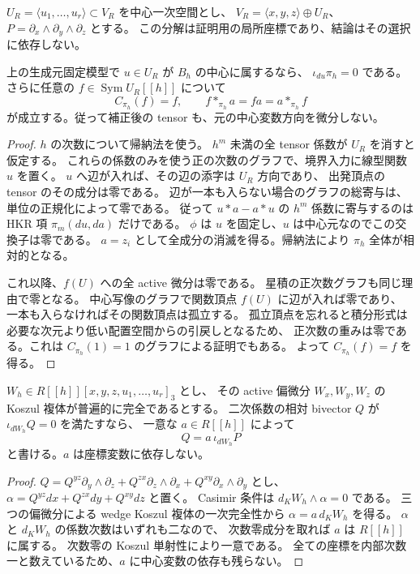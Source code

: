 $U_R=\langle u_1,\ldots,u_r\rangle\subset V_R$ を中心一次空間とし、
$V_R=\langle x,y,z\rangle\oplus U_R$、$P=\partial_x\wedge\partial_y\wedge\partial_z$ とする。
この分解は証明用の局所座標であり、結論はその選択に依存しない。

\begin{lemma}[線型中心の厳密な保存]
\label{lem:nfm-formal-linear-center}
上の生成元固定模型で $u\in U_R$ が $B_h$ の中心に属するなら、
$\iota_{du}\pi_h=0$ である。
さらに任意の $f\in\operatorname{Sym}U_R[[h]]$ について
\[
 C_{\pi_h}(f)=f,
 \qquad f*_{\pi_h}a=fa=a*_{\pi_h}f
\]
が成立する。従って補正後の tensor も、元の中心変数方向を微分しない。
\end{lemma}

\begin{proof}
$h$ の次数について帰納法を使う。
$h^m$ 未満の全 tensor 係数が $U_R$ を消すと仮定する。
これらの係数のみを使う正の次数のグラフで、境界入力に線型関数 $u$ を置く。
$u$ へ辺が入れば、その辺の添字は $U_R$ 方向であり、
出発頂点の tensor のその成分は零である。
辺が一本も入らない場合のグラフの総寄与は、単位の正規化によって零である。
従って $u* a-a*u$ の $h^m$ 係数に寄与するのは
HKR 項 $\pi_m(du,da)$ だけである。
$\phi$ は $u$ を固定し、$u$ は中心元なのでこの交換子は零である。
$a=z_i$ として全成分の消滅を得る。帰納法により $\pi_h$ 全体が相対的となる。

これ以降、$f(U)$ への全 active 微分は零である。
星積の正次数グラフも同じ理由で零となる。
中心写像のグラフで関数頂点 $f(U)$ に辺が入れば零であり、
一本も入らなければその関数頂点は孤立する。
孤立頂点を忘れると積分形式は必要な次元より低い配置空間からの引戻しとなるため、
正次数の重みは零である。これは $C_{\pi_h}(1)=1$ のグラフによる証明でもある。
よって $C_{\pi_h}(f)=f$ を得る。
\end{proof}

\begin{lemma}
\label{lem:nfm-relative-casimir-tensor}
$W_h\in R[[h]][x,y,z,u_1,\ldots,u_r]_3$ とし、
その active 偏微分 $W_x,W_y,W_z$ の Koszul 複体が普遍的に完全であるとする。
二次係数の相対 bivector $Q$ が $\iota_{dW_h}Q=0$ を満たすなら、
一意な $a\in R[[h]]$ によって
\[
 Q=a\,\iota_{dW_h}P
\]
と書ける。$a$ は座標変数に依存しない。
\end{lemma}

\begin{proof}
$Q=Q^{yz}\partial_y\wedge\partial_z+
Q^{zx}\partial_z\wedge\partial_x+Q^{xy}\partial_x\wedge\partial_y$ とし、
$\alpha=Q^{yz}dx+Q^{zx}dy+Q^{xy}dz$ と置く。
Casimir 条件は $d_KW_h\wedge\alpha=0$ である。
三つの偏微分による wedge Koszul 複体の一次完全性から
$\alpha=a\,d_KW_h$ を得る。
$\alpha$ と $d_KW_h$ の係数次数はいずれも二なので、
次数零成分を取れば $a$ は $R[[h]]$ に属する。
次数零の Koszul 単射性により一意である。
全ての座標を内部次数一と数えているため、$a$ に中心変数の依存も残らない。
\end{proof}

